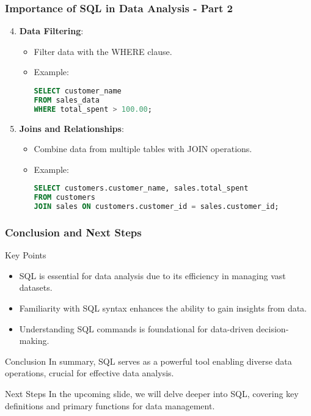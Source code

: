 \documentclass{beamer}
\begin{document}
\begin{frame}[fragile]
    \frametitle{Importance of SQL in Data Analysis - Part 2}
    \begin{enumerate}
        \setcounter{enumi}{3}
        \item \textbf{Data Filtering}:
        \begin{itemize}
            \item Filter data with the WHERE clause.
            \item Example:
            \begin{lstlisting}[language=SQL]
SELECT customer_name 
FROM sales_data 
WHERE total_spent > 100.00;
            \end{lstlisting}
        \end{itemize}

        \item \textbf{Joins and Relationships}:
        \begin{itemize}
            \item Combine data from multiple tables with JOIN operations.
            \item Example:
            \begin{lstlisting}[language=SQL]
SELECT customers.customer_name, sales.total_spent 
FROM customers 
JOIN sales ON customers.customer_id = sales.customer_id;
            \end{lstlisting}
        \end{itemize}
    \end{enumerate}
\end{frame}

\begin{frame}[fragile]
    \frametitle{Conclusion and Next Steps}
    \begin{block}{Key Points}
        \begin{itemize}
            \item SQL is essential for data analysis due to its efficiency in managing vast datasets.
            \item Familiarity with SQL syntax enhances the ability to gain insights from data.
            \item Understanding SQL commands is foundational for data-driven decision-making.
        \end{itemize}
    \end{block}
    
    \begin{block}{Conclusion}
        In summary, SQL serves as a powerful tool enabling diverse data operations, crucial for effective data analysis.
    \end{block}
    
    \begin{block}{Next Steps}
        In the upcoming slide, we will delve deeper into SQL, covering key definitions and primary functions for data management.
    \end{block}
\end{frame}
\end{document}
